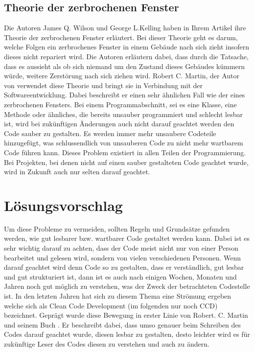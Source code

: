 \subsection{Theorie der zerbrochenen Fenster}
Die Autoren James Q. Wilson und George L.Kelling haben in Ihrem Artikel \cite{Wilson2016} ihre Theorie der zerbrochenen Fenster erläutert. Bei dieser Theorie geht es darum, welche Folgen ein zerbrochenes Fenster in einem Gebäude nach sich zieht insofern dieses nicht repariert wird. Die Autoren erläutern dabei, dass durch die Tatsache, dass es aussieht als ob sich niemand um den Zustand dieses Gebäudes kümmern würde, weitere Zerstörung nach sich ziehen wird. Robert C. Martin, der Autor von \cite{Martin2008} verwendet diese Theorie und bringt sie in Verbindung mit der Softwareentwicklung. Dabei beschreibt er einen sehr ähnlichen Fall wie der eines zerbrochenen Fensters. Bei einem Programmabschnitt, sei es eine Klasse, eine Methode oder ähnliches, die bereits unsauber programmiert und schlecht lesbar ist, wird bei zukünftigen Änderungen auch nicht darauf geachtet werden den Code sauber zu gestalten. Es werden immer mehr unsaubere Codeteile hinzugefügt, was schlussendlich von unsauberen Code zu nicht mehr wartbarem Code führen kann. Dieses Problem existiert in allen Teilen der Programmierung. Bei Projekten, bei denen nicht auf einen sauber gestalteten Code geachtet wurde, wird in Zukunft auch nur selten darauf geachtet.

\section{Lösungsvorschlag}
Um diese Probleme zu vermeiden, sollten Regeln und Grundsätze gefunden werden, wie gut lesbarer bzw. wartbarer Code gestaltet werden kann. Dabei ist es sehr wichtig darauf zu achten, dass der Code meist nicht nur von einer Person bearbeitet und gelesen wird, sondern von vielen verschiedenen Personen. Wenn darauf geachtet wird denn Code so zu gestalten, dass er verständlich, gut lesbar und gut strukturiert ist, dann ist es auch nach einigen Wochen, Monaten und Jahren noch gut möglich zu verstehen, was der Zweck der betrachteten Codestelle ist. In den letzten Jahren hat sich zu diesem Thema eine Strömung ergeben welche sich als Clean Code Development (im folgenden nur noch CCD) bezeichnet. Geprägt wurde diese Bewegung in erster Linie von Robert. C. Martin und seinem Buch \cite{Martin2008}. Er beschreibt dabei, dass umso genauer beim Schreiben des Codes darauf geachtet wurde, diesen lesbar zu gestalten, desto leichter wird es für zukünftige Leser des Codes diesen zu verstehen und auch zu ändern. 

